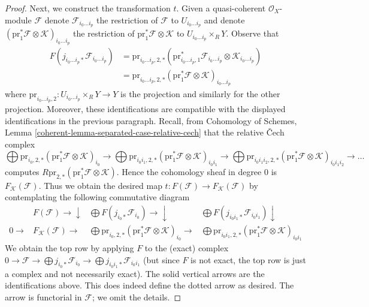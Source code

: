 \begin{proof}
\medskip\noindent
Next, we construct the transformation $t$. Given a quasi-coherent
$\mathcal{O}_X$-module $\mathcal{F}$ denote $\mathcal{F}_{i_0 \ldots i_p}$
the restriction of $\mathcal{F}$ to $U_{i_0 \ldots i_p}$ and denote
$(\text{pr}_1^*\mathcal{F} \otimes \mathcal{K})_{i_0 \ldots i_p}$
the restriction of $\text{pr}_1^*\mathcal{F} \otimes \mathcal{K}$ to
$U_{i_0 \ldots i_p} \times_R Y$.
Observe that
\begin{align*}
F(j_{i_0 \ldots i_p *}\mathcal{F}_{i_0 \ldots i_p})
& =
\text{pr}_{i_0 \ldots i_p, 2, *}(
\text{pr}_{i_0 \ldots i_p, 1}^*\mathcal{F}_{i_0 \ldots i_p}
\otimes \mathcal{K}_{i_0 \ldots i_p}) \\
& =
\text{pr}_{i_0 \ldots i_p, 2, *}
(\text{pr}_1^*\mathcal{F} \otimes \mathcal{K})_{i_0 \ldots i_p}
\end{align*}
where $\text{pr}_{i_0 \ldots i_p, 2} : U_{i_0 \ldots i_p} \times_R Y \to Y$
is the projection and similarly for the other projection. Moreover, these
identifications are compatible with the displayed identifications
in the previous paragraph. Recall, from Cohomology of Schemes, Lemma
\ref{coherent-lemma-separated-case-relative-cech}
that the relative {\v C}ech complex
$$
\bigoplus
\text{pr}_{i_0, 2, *}
(\text{pr}_1^*\mathcal{F} \otimes \mathcal{K})_{i_0}
\to
\bigoplus
\text{pr}_{i_0i_1, 2, *}
(\text{pr}_1^*\mathcal{F} \otimes \mathcal{K})_{i_0i_1}
\to
\bigoplus
\text{pr}_{i_0i_1i_2, 2, *}
(\text{pr}_1^*\mathcal{F} \otimes \mathcal{K})_{i_0i_1i_2}
\to \ldots
$$
computes $R\text{pr}_{2, *}(\text{pr}_1^*\mathcal{F} \otimes \mathcal{K})$.
Hence the cohomology sheaf in degree $0$ is $F_\mathcal{K}(\mathcal{F})$.
Thus we obtain the desired map
$t : F(\mathcal{F}) \to F_\mathcal{K}(\mathcal{F})$
by contemplating the following commutative diagram
$$
\begin{array}{cccc} & F(\mathcal{F}) \longrightarrow\downarrow & \bigoplus F(j_{i_0*}\mathcal{F}_{i_0}) \longrightarrow\downarrow & \bigoplus F(j_{i_0i_1*}\mathcal{F}_{i_0i_1}) \downarrow \\ 0 \longrightarrow & F_\mathcal{K}(\mathcal{F}) \longrightarrow & \bigoplus
\text{pr}_{i_0, 2, *}
(\text{pr}_1^*\mathcal{F} \otimes \mathcal{K})_{i_0}
\longrightarrow & \bigoplus
\text{pr}_{i_0i_1, 2, *}
(\text{pr}_1^*\mathcal{F} \otimes \mathcal{K})_{i_0i_1}\end{array}
$$
We obtain the top row by applying $F$ to the (exact) complex
$0 \to \mathcal{F} \to \bigoplus j_{i_0*}\mathcal{F}_{i_0} \to
\bigoplus j_{i_0i_1*}\mathcal{F}_{i_0i_1}$ (but since
$F$ is not exact, the top row is just a complex and not
necessarily exact).
The solid vertical arrows are the identifications above.
This does indeed define the dotted arrow as desired.
The arrow is functorial in $\mathcal{F}$; we omit the details.


\end{proof}
